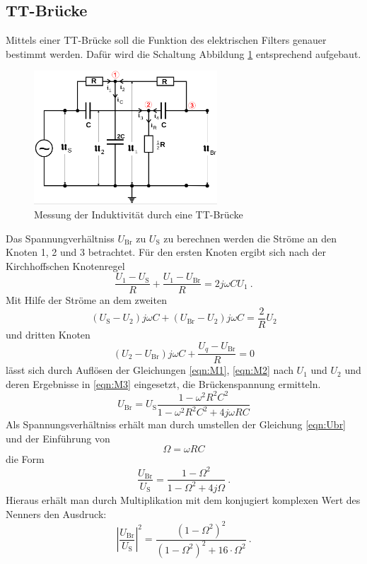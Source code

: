\subsection{TT-Brücke}
Mittels einer TT-Brücke soll die Funktion des elektrischen Filters genauer bestimmt werden. Dafür wird die Schaltung Abbildung \ref{fig:TT} entsprechend aufgebaut.
\begin{figure}
  \centering
  \includegraphics[height=5cm]{picture/7.png}
  \caption{Messung der Induktivität durch eine TT-Brücke \cite{sample}}
  \label{fig:TT}
\end{figure}
Das Spannungverhältniss $U_\text{Br}$ zu $U_\text{S}$ zu berechnen werden die Ströme an den Knoten 1, 2 und 3 betrachtet. Für den ersten Knoten ergibt sich nach der Kirchhoffschen Knotenregel
\begin{equation}
  \frac{U_1 - U_\text{S}}{R} + \frac{U_1 - U_\text{Br}}{R} = 2 j \omega C U_1 \ .
  \label{eqn:M1}
\end{equation}
Mit Hilfe der Ströme an dem zweiten
\begin{equation}
  \left( U_\text{S} - U_2 \right) j \omega C + \left( U_\text{Br} - U_2 \right)j \omega C = \frac{2}{R} U_2
  \label{eqn:M2}
\end{equation}
und dritten Knoten
\begin{equation}
  \left( U_2 - U_\text{Br} \right)j \omega C + \frac{U_q - U_\text{Br}}{R} = 0
  \label{eqn:M3}
\end{equation}
lässt sich durch Auflösen der Gleichungen \ref{eqn:M1}, \ref{eqn:M2} nach $U_1$ und $U_2$ und deren Ergebnisse in \ref{eqn:M3} eingesetzt, die Brückenspannung ermitteln.
\begin{equation}
  U_\text{Br} = U_\text{S} \frac{1 - \omega^2 R^2 C^2}{1 - \omega^2 R^2 C^2 + 4 j \omega R C}
  \label{eqn:Ubr}
\end{equation}
Als Spannungsverhältniss erhält man durch umstellen der Gleichung \ref{eqn:Ubr} und der Einführung von
\begin{equation*}
  \Omega = \omega R C
\end{equation*}
die Form
\begin{equation*}
  \frac{U_\text{Br}}{U_\text{S}} = \frac{1 - \Omega^2}{1 - \Omega^2 + 4 j \Omega} \ .
\end{equation*}
Hieraus erhält man durch Multiplikation mit dem konjugiert komplexen Wert
des Nenners den Ausdruck:
\begin{equation}
  \left| \frac{U_\text{Br}}{U_\text{S}} \right|^2 = \frac{(1 - \Omega^2)^2}{(1 - \Omega^2)^2 + 16 \cdot \Omega^2} \ .
  \label{eqn:BrS}
\end{equation}

